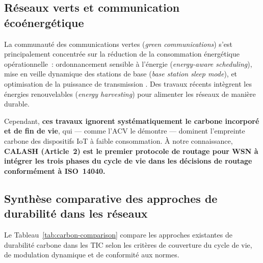 \subsection{Réseaux verts et communication écoénergétique}

La communauté des communications vertes (\emph{green communications}) s'est principalement concentrée sur la réduction de la consommation énergétique opérationnelle~: ordonnancement sensible à l'énergie (\emph{energy-aware scheduling}), mise en veille dynamique des stations de base (\emph{base station sleep mode}), et optimisation de la puissance de transmission \cite{freitag2021ict,andrae2021real_climate,itu_ict2025}. Des travaux récents intègrent les énergies renouvelables (\emph{energy harvesting}) pour alimenter les réseaux de manière durable.

Cependant, \textbf{ces travaux ignorent systématiquement le carbone incorporé et de fin de vie}, qui --- comme l'ACV le démontre --- dominent l'empreinte carbone des dispositifs IoT à faible consommation. À notre connaissance, \textbf{CALASH (Article~2) est le premier protocole de routage pour WSN à intégrer les trois phases du cycle de vie dans les décisions de routage conformément à ISO~14040.}

\subsection{Synthèse comparative des approches de durabilité dans les réseaux}

Le Tableau~\ref{tab:carbon-comparison} compare les approches existantes de durabilité carbone dans les TIC selon les critères de couverture du cycle de vie, de modulation dynamique et de conformité aux normes.

